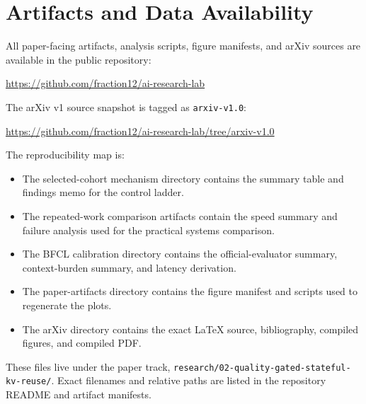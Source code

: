 \documentclass[11pt]{article}
\begin{document}
\clearpage

\section{Artifacts and Data Availability}

All paper-facing artifacts, analysis scripts, figure manifests, and arXiv sources are available in the public repository:
\begin{center}
\url{https://github.com/fraction12/ai-research-lab}
\end{center}
The arXiv v1 source snapshot is tagged as \texttt{arxiv-v1.0}:
\begin{center}
\url{https://github.com/fraction12/ai-research-lab/tree/arxiv-v1.0}
\end{center}

The reproducibility map is:
\begin{itemize}[leftmargin=*]
  \item The selected-cohort mechanism directory contains the summary table and findings memo for the control ladder.
  \item The repeated-work comparison artifacts contain the speed summary and failure analysis used for the practical systems comparison.
  \item The BFCL calibration directory contains the official-evaluator summary, context-burden summary, and latency derivation.
  \item The paper-artifacts directory contains the figure manifest and scripts used to regenerate the plots.
  \item The arXiv directory contains the exact LaTeX source, bibliography, compiled figures, and compiled PDF.
\end{itemize}

These files live under the paper track, \texttt{research/02-quality-gated-stateful-kv-reuse/}. Exact filenames and relative paths are listed in the repository README and artifact manifests.



\end{document}
